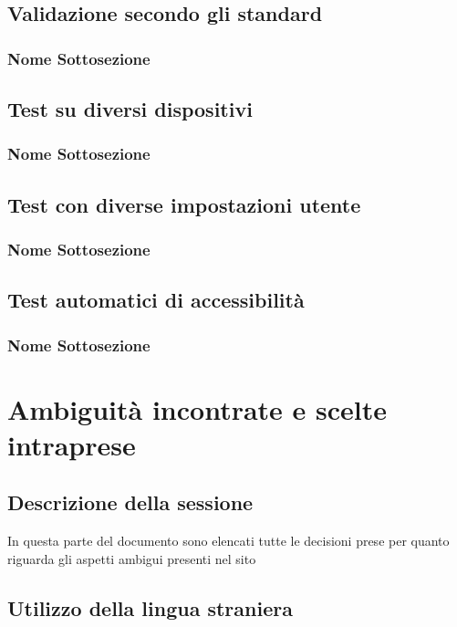 \documentclass[openany, a4paper, 12pt]{report}
\begin{document}
	\section{Validazione secondo gli standard}
	\subsection{Nome Sottosezione}
	\section{Test su diversi dispositivi}
	\subsection{Nome Sottosezione}
	\section{Test con diverse impostazioni utente}
	\subsection{Nome Sottosezione}
	\section{Test automatici di accessibilità}
	\subsection{Nome Sottosezione}
	
	\chapter{Ambiguità incontrate e scelte intraprese}
		\section{Descrizione della sessione}
			In questa parte del documento sono elencati tutte le decisioni prese per quanto riguarda gli aspetti ambigui presenti nel sito\\
		\section{Utilizzo della lingua straniera}
\end{document}
